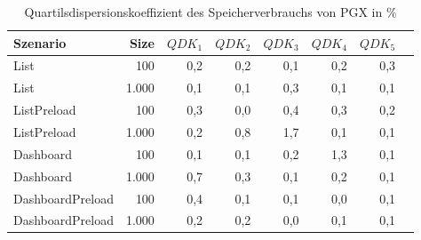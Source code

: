 
\begin{table}[ht]
\setlength{\extrarowheight}{-1pt}
\centering
\caption{Quartilsdispersionskoeffizient des Speicherverbrauchs von PGX in \%}
\begin{tabular}{lrrrrrrr}
\toprule
Szenario & Size & ${QDK_1}$ & ${QDK_2}$ & ${QDK_3}$& ${QDK_4}$ & ${QDK_5}$ \\
\midrule
	List & 100 & \cellcolor{red!1}  0,2 & \cellcolor{red!1}  0,2 & \cellcolor{red!1}  0,1 & \cellcolor{red!1}  0,2 & \cellcolor{red!1}  0,3 \\
	List & 1.000 & \cellcolor{red!1}  0,1 & \cellcolor{red!1}  0,1 & \cellcolor{red!1}  0,3 & \cellcolor{red!1}  0,1 & \cellcolor{red!1}  0,1 \\
	ListPreload & 100 & \cellcolor{red!1}  0,3 & \cellcolor{red!1}  0,0 & \cellcolor{red!1}  0,4 & \cellcolor{red!1}  0,3 & \cellcolor{red!1}  0,2 \\
	ListPreload & 1.000 & \cellcolor{red!1}  0,2 & \cellcolor{red!1}  0,8 & \cellcolor{red!2}  1,7 & \cellcolor{red!1}  0,1 & \cellcolor{red!1}  0,1 \\
	Dashboard & 100 & \cellcolor{red!1}  0,1 & \cellcolor{red!1}  0,1 & \cellcolor{red!1}  0,2 & \cellcolor{red!2}  1,3 & \cellcolor{red!1}  0,1 \\
	Dashboard & 1.000 & \cellcolor{red!1}  0,7 & \cellcolor{red!1}  0,3 & \cellcolor{red!1}  0,1 & \cellcolor{red!1}  0,2 & \cellcolor{red!1}  0,1 \\
	DashboardPreload & 100 & \cellcolor{red!1}  0,4 & \cellcolor{red!1}  0,1 & \cellcolor{red!1}  0,1 & \cellcolor{red!1}  0,0 & \cellcolor{red!1}  0,1 \\
	DashboardPreload & 1.000 & \cellcolor{red!1}  0,2 & \cellcolor{red!1}  0,2 & \cellcolor{red!1}  0,0 & \cellcolor{red!1}  0,1 & \cellcolor{red!1}  0,1 \\
\bottomrule
\end{tabular}
\label{tab:quartilsdispersionskoeffizient_speicherverbrauch_pgx}
\end{table}
	